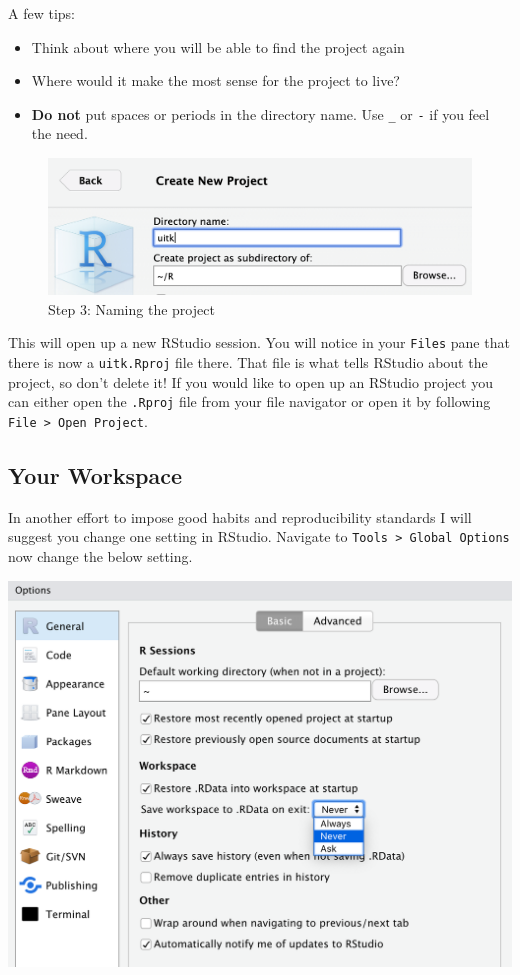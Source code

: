 \documentclass[
]{book}
\providecommand{\tightlist}{%
  \setlength{\itemsep}{0pt}\setlength{\parskip}{0pt}}
\begin{document}
A few tips:

\begin{itemize}
\tightlist
\item
  Think about where you will be able to find the project again
\item
  Where would it make the most sense for the project to live?
\item
  \textbf{Do not} put spaces or periods in the directory name. Use \texttt{\_} or \texttt{-} if you feel the need.
\end{itemize}

\begin{figure}
\centering
\includegraphics{static/03-project.png}
\caption{Step 3: Naming the project}
\end{figure}

This will open up a new RStudio session. You will notice in your \texttt{Files} pane that there is now a \texttt{uitk.Rproj} file there. That file is what tells RStudio about the project, so don't delete it! If you would like to open up an RStudio project you can either open the \texttt{.Rproj} file from your file navigator or open it by following \texttt{File\ \textgreater{}\ Open\ Project}.

\hypertarget{your-workspace}{%
\subsection{Your Workspace}\label{your-workspace}}

In another effort to impose good habits and reproducibility standards I will suggest you change one setting in RStudio. Navigate to \texttt{Tools\ \textgreater{}\ Global\ Options} now change the below setting.

\includegraphics{static/save-workspace.png}
\end{document}
